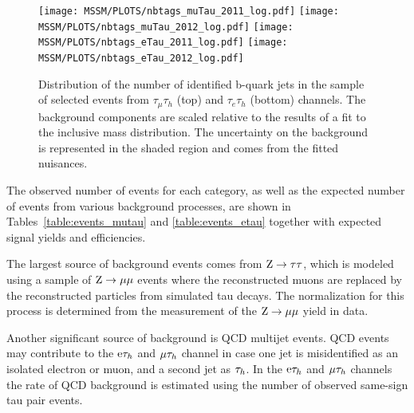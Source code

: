\begin{figure}[htbp]
  \begin{center}
    \texttt{[image: MSSM/PLOTS/nbtags\_muTau\_2011\_log.pdf]}
    \texttt{[image: MSSM/PLOTS/nbtags\_muTau\_2012\_log.pdf]}
    \texttt{[image: MSSM/PLOTS/nbtags\_eTau\_2011\_log.pdf]}
    \texttt{[image: MSSM/PLOTS/nbtags\_eTau\_2012\_log.pdf]}
    \caption{
      Distribution of the number of identified b-quark jets in the sample of
selected events from $\tau_{\mu}\tau_{h}$ (top) and  $\tau_{e}\tau_{h}$ (bottom)
channels.  The background components are scaled relative to the results of a fit
to the inclusive mass distribution.  The uncertainty on the background is represented
in the shaded region and comes from the fitted nuisances.
    }
    \label{fig:nbjets}
  \end{center}
\end{figure}



The observed number of events for each category, as well as the expected 
number of events from various background processes, 
are shown in Tables~\ref{table:events_mutau} and \ref{table:events_etau} %
together with expected signal yields and efficiencies.

The largest source of background events comes from $\mathrm{Z}\to\mathrm{\tau}\mathrm{\tau}$, which 
is modeled using a sample of $\mathrm{Z}\to\mathrm{\mu}\mathrm{\mu}$ events where the 
reconstructed muons are replaced by the reconstructed particles from 
simulated tau decays. The normalization for this process is determined 
from the measurement of the $\mathrm{Z}\to\mathrm{\mu}\mathrm{\mu}$ yield in data. 

Another significant source of background is QCD multijet events.
QCD events may contribute to the $\mathrm{e}\mathrm{\tau}_h$ and $\mathrm{\mu}\mathrm{\tau}_h$ channel
in case one jet is misidentified as an isolated electron or muon, and a second jet as $\mathrm{\tau}_h$.
In the $\mathrm{e}\mathrm{\tau}_h$ and $\mathrm{\mu}\mathrm{\tau}_h$ channels the rate of QCD 
background is estimated using the number of observed same-sign
tau pair events.

